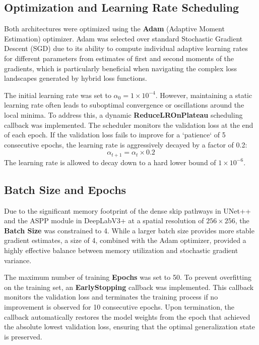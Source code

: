 \subsection{Optimization and Learning Rate Scheduling}
Both architectures were optimized using the \textbf{Adam} (Adaptive Moment Estimation) optimizer. Adam was selected over standard Stochastic Gradient Descent (SGD) due to its ability to compute individual adaptive learning rates for different parameters from estimates of first and second moments of the gradients, which is particularly beneficial when navigating the complex loss landscapes generated by hybrid loss functions.

The initial learning rate was set to $\alpha_0 = 1 \times 10^{-4}$. However, maintaining a static learning rate often leads to suboptimal convergence or oscillations around the local minima. To address this, a dynamic \textbf{ReduceLROnPlateau} scheduling callback was implemented. The scheduler monitors the validation loss at the end of each epoch. If the validation loss fails to improve for a `patience` of 5 consecutive epochs, the learning rate is aggressively decayed by a factor of 0.2:
\begin{equation}
    \alpha_{t+1} = \alpha_t \times 0.2
\end{equation}
The learning rate is allowed to decay down to a hard lower bound of $1 \times 10^{-6}$.

\subsection{Batch Size and Epochs}
Due to the significant memory footprint of the dense skip pathways in UNet++ and the ASPP module in DeepLabV3+ at a spatial resolution of $256 \times 256$, the \textbf{Batch Size} was constrained to 4. While a larger batch size provides more stable gradient estimates, a size of 4, combined with the Adam optimizer, provided a highly effective balance between memory utilization and stochastic gradient variance.

The maximum number of training \textbf{Epochs} was set to 50. To prevent overfitting on the training set, an \textbf{EarlyStopping} callback was implemented. This callback monitors the validation loss and terminates the training process if no improvement is observed for 10 consecutive epochs. Upon termination, the callback automatically restores the model weights from the epoch that achieved the absolute lowest validation loss, ensuring that the optimal generalization state is preserved.

